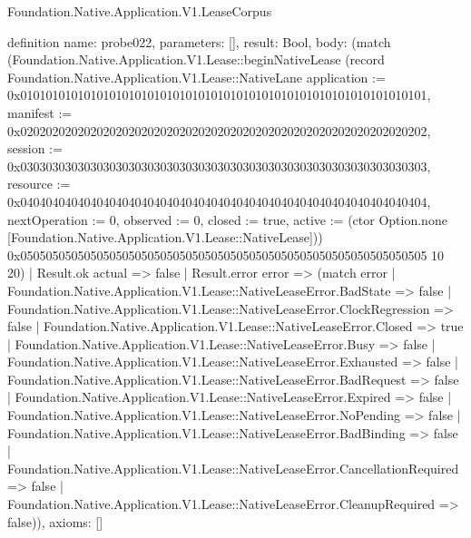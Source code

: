 \begin{lexlean}{Foundation.Native.Application.V1.LeaseCorpus}
\begin{semanticmodule}
definition{
  name: probe022,
  parameters: [],
  result: Bool,
  body: (match (Foundation.Native.Application.V1.Lease::beginNativeLease (record Foundation.Native.Application.V1.Lease::NativeLane {application := 0x0101010101010101010101010101010101010101010101010101010101010101, manifest := 0x0202020202020202020202020202020202020202020202020202020202020202, session := 0x0303030303030303030303030303030303030303030303030303030303030303, resource := 0x0404040404040404040404040404040404040404040404040404040404040404, nextOperation := 0, observed := 0, closed := true, active := (ctor Option.none [Foundation.Native.Application.V1.Lease::NativeLease])}) 0x0505050505050505050505050505050505050505050505050505050505050505 10 20)
    | Result.ok actual => false
    | Result.error error => (match error
      | Foundation.Native.Application.V1.Lease::NativeLeaseError.BadState => false
      | Foundation.Native.Application.V1.Lease::NativeLeaseError.ClockRegression => false
      | Foundation.Native.Application.V1.Lease::NativeLeaseError.Closed => true
      | Foundation.Native.Application.V1.Lease::NativeLeaseError.Busy => false
      | Foundation.Native.Application.V1.Lease::NativeLeaseError.Exhausted => false
      | Foundation.Native.Application.V1.Lease::NativeLeaseError.BadRequest => false
      | Foundation.Native.Application.V1.Lease::NativeLeaseError.Expired => false
      | Foundation.Native.Application.V1.Lease::NativeLeaseError.NoPending => false
      | Foundation.Native.Application.V1.Lease::NativeLeaseError.BadBinding => false
      | Foundation.Native.Application.V1.Lease::NativeLeaseError.CancellationRequired => false
      | Foundation.Native.Application.V1.Lease::NativeLeaseError.CleanupRequired => false)),
  axioms: []
}


\end{semanticmodule}
\end{lexlean}
